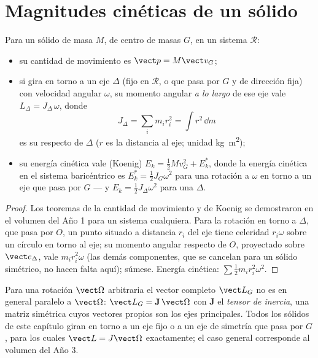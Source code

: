 \section{Magnitudes cinéticas de un sólido}

\begin{proposition}\label{prop:b2:rigid-body-mechanics:kinetic}
Para un sólido de masa $M$, de centro de masas $G$, en un sistema $\mathcal R$:
\begin{itemize}
  \item su cantidad de movimiento es $\vect p = M\vect v_G$;
  \item si gira en torno a un eje $\Delta$ (fijo en $\mathcal R$, o que
        pasa por $G$ y de dirección fija) con velocidad angular
        $\omega$, su momento angular \emph{a lo largo} de ese eje vale
        $L_\Delta = J_\Delta\,\omega$, donde
        \[
        J_\Delta = \sum_i m_i r_i^2 = \int r^2\,\dd m
        \]
        es su \emph{} respecto de $\Delta$ ($r$ es la
        distancia al eje; unidad \unit{kg.m^2});
  \item su energía cinética vale (Koenig) $E_k = \tfrac12Mv_G^2 +
        E_k^*$, donde la energía cinética en el sistema baricéntrico es
        $E_k^* = \tfrac12J_{G}\omega^2$ para una rotación a $\omega$ en
        torno a un eje que pasa por $G$ --- y $E_k = \tfrac12J_\Delta\omega^2$
        para una  $\Delta$.
\end{itemize}
\end{proposition}

\begin{proof}
Los teoremas de la cantidad de movimiento y de Koenig se demostraron en el
volumen del Año 1 para un sistema cualquiera. Para la rotación en torno a
$\Delta$, que pasa por $O$, un punto situado a distancia $r_i$ del eje
tiene celeridad $r_i\omega$ sobre un círculo en torno al eje; su momento
angular respecto de $O$, proyectado sobre $\vect e_\Delta$, vale
$m_ir_i^2\omega$ (las demás componentes, que se cancelan para un sólido
simétrico, no hacen falta aquí); súmese. Energía cinética: $\sum\tfrac12m_ir_i^2
\omega^2$.
\end{proof}

\begin{remark}\label{rem:b2:rigid-body-mechanics:tensor}
Para una rotación $\vect\Omega$ arbitraria el vector completo $\vect L_G$
no es en general paralelo a $\vect\Omega$: $\vect L_G = \mathbf J\,\vect\Omega$
con $\mathbf J$ el \emph{tensor de inercia}, una matriz simétrica cuyos
vectores propios son los ejes principales. Todos los sólidos de este
capítulo giran en torno a un eje fijo o a un eje de simetría que pasa por
$G$, para los cuales $\vect L = J\vect\Omega$ exactamente; el caso general
corresponde al volumen del Año 3.
\end{remark}

